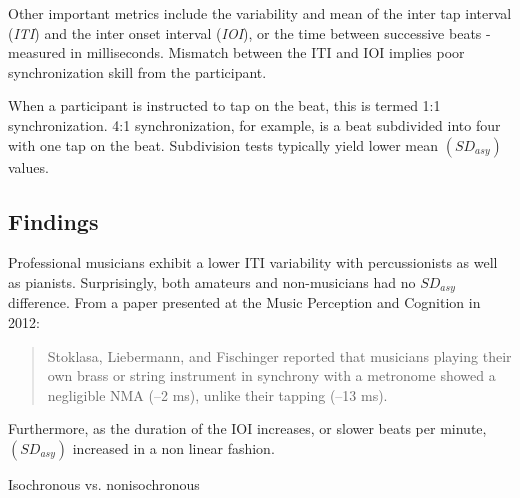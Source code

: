 Other important metrics include the variability and mean of the inter tap interval (\textit{ITI}) and the inter onset interval (\textit{IOI}), or the time between successive beats - measured in milliseconds. Mismatch between the ITI and IOI implies poor synchronization skill from the participant. 

When a participant is instructed to tap on the beat, this is termed 1:1 synchronization. 4:1 synchronization, for example, is a beat subdivided into four with one tap on the beat. Subdivision tests typically yield lower mean $(SD_{asy})$ values. \cite{repp2013sensorimotor}

\subsection{Findings} \label{SMSFindings}
Professional musicians exhibit a lower ITI variability with percussionists as well as pianists. Surprisingly, both amateurs and non-musicians had no $SD_{asy}$ difference. From a paper presented at the Music Perception and Cognition in 2012:
\begin{quotation}
    Stoklasa, Liebermann, and Fischinger reported that musicians playing their own brass or string instrument in synchrony with a metronome showed a negligible NMA (–2 ms), unlike their tapping (–13 ms). \cite{repp2013sensorimotor}
\end{quotation}

Furthermore, as the duration of the IOI increases, or slower beats per minute, $(SD_{asy})$ increased in a non linear fashion. 

Isochronous vs. nonisochronous ~\cite{polak2016both}